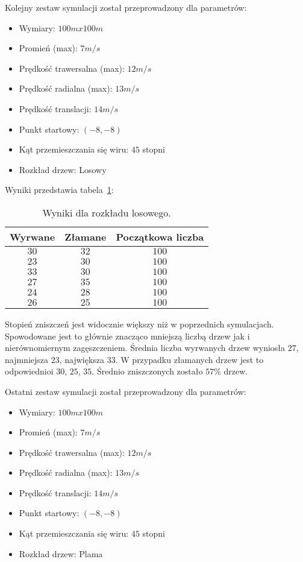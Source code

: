 Kolejny zestaw symulacji został przeprowadzony dla parametrów:
\begin{itemize}
\item Wymiary: $100m x 100m$
\item Promień (max): $7m/s$
\item Prędkość trawersalna (max): $12m/s$
\item Prędkość radialna (max): $13m/s$
\item Prędkość translacji: $14m/s$
\item Punkt startowy: $(-8, -8)$
\item Kąt przemieszczania się wiru: $45$ stopni
\item Rozkład drzew: Losowy
\end{itemize}

Wyniki przedstawia tabela~\ref{tab:sym2}:

 \begin{table}[h!]
 \caption{Wyniki dla rozkładu losowego.}
 \label{tab:sym2}
 \begin{center}
\begin{tabular} {|c|c|c|}
\hline
Wyrwane & Złamane & Początkowa liczba \\ \hline \hline
$30$ 	& $32$ 	&	$100$ \\ \hline
$23$ 	& $30$ 	&	$100$ \\ \hline
$33$ 	& $30$ 	&	$100$ \\ \hline
$27$ 	& $35$ 	&	$100$ \\ \hline
$24$ 	& $28$ 	&	$100$ \\ \hline
$26$ 	& $25$ 	&	$100$ \\ \hline
\end{tabular}
\end{center}
\end{table}


Stopień zniszczeń jest widocznie większy niż w poprzednich symulacjach. Spowodowane jest to głównie znacząco mniejszą liczbą drzew jak i nierównomiernym zagęszczeniem. Średnia liczba wyrwanych drzew wyniosła $27$, najmniejsza $23$, największa $33$. W przypadku złamanych drzew jest to odpowiednioi $30$, $25$, $35$.
Średnio zniszczonych zostało $57\%$ drzew.

Ostatni zestaw symulacji został przeprowadzony dla parametrów:
\begin{itemize}
\item Wymiary: $100m x 100m$
\item Promień (max): $7m/s$
\item Prędkość trawersalna (max): $12m/s$
\item Prędkość radialna (max): $13m/s$
\item Prędkość translacji: $14m/s$
\item Punkt startowy: $(-8, -8)$
\item Kąt przemieszczania się wiru: $45$ stopni
\item Rozkład drzew: Plama
\end{itemize}

